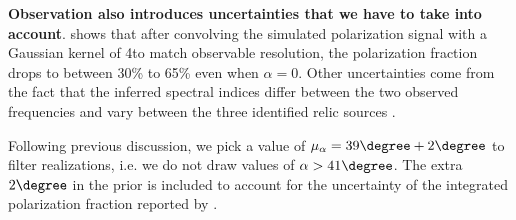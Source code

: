 %
\textbf{Observation also introduces uncertainties that we have to take into account}. \cite{S13} shows that after convolving the
simulated polarization signal with a Gaussian kernel of 4\arcmin to match
observable resolution, the polarization fraction drops to between 30\% to
65\% even when $\alpha = 0$. 
Other uncertainties come from the fact that the inferred spectral indices differ between the two observed frequencies and vary between the three identified relic sources \citep{L13}.\par 
Following previous discussion, we pick a value of $\mu_\alpha =39\degree +
2 \degree$ to filter realizations, i.e. we do not draw values of $\alpha >
41\degree$. The extra $2 \degree$ in the prior is included to account for the uncertainty of the integrated polarization fraction reported by \cite{L13}. 


